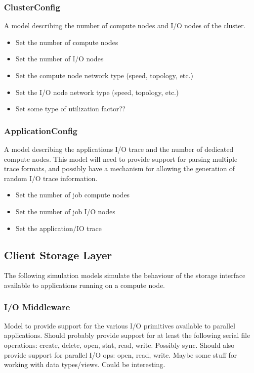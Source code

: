 \documentclass[11pt]{article}
\begin{document}
\subsubsection{ClusterConfig}
A model describing the number of compute nodes and I/O nodes of the cluster.

\begin{itemize}
\item Set the number of compute nodes
\item Set the number of I/O nodes
\item Set the compute node network type (speed, topology, etc.)
\item Set the I/O node network type (speed, topology, etc.)
\item Set some type of utilization factor??
\end{itemize}

\subsubsection{ApplicationConfig}
A model describing the applications I/O trace and the number of dedicated
compute nodes.  This model will need to provide support for parsing multiple
trace formats, and possibly have a mechanism for allowing the generation of
random I/O trace information.

\begin{itemize}
\item Set the number of job compute nodes
\item Set the number of job I/O nodes
\item Set the application/IO trace
\end{itemize}

\subsection{Client Storage Layer}
The following simulation models simulate the behaviour of the storage
interface available to applications running on a compute node.

\subsubsection{I/O Middleware}
Model to provide support for the various I/O primitives available to parallel
applications.  Should probably provide support for at least the following
serial file operations:  create, delete, open, stat, read, write.  Possibly 
sync.  Should also provide support for parallel I/O ops: open, read, write.
Maybe some stuff for working with data types/views.  Could be interesting.
\end{document}
